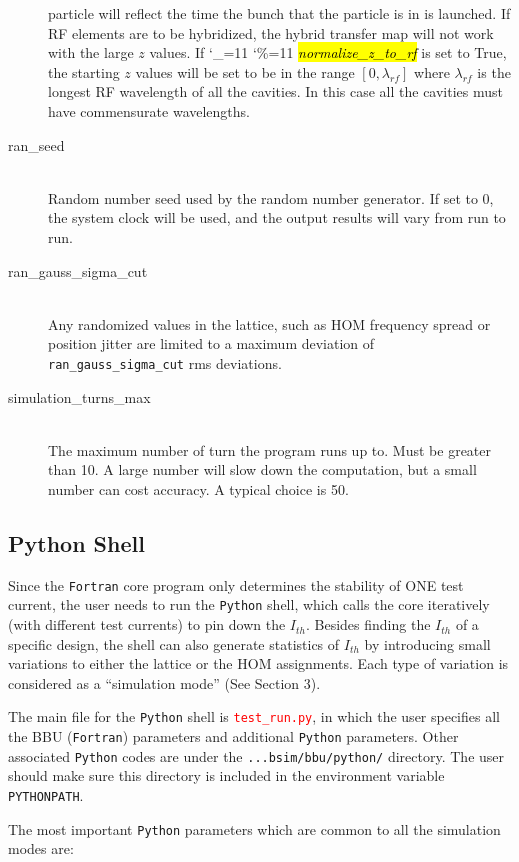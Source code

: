 \documentclass{hitec}
\newcommand\dottcmd[1]{\hl{\em#1}\endgroup}
\newcommand{\vn}{\begingroup\catcode`\_=11 \catcode`\%=11 \dottcmd}
\newcommand{\Newline}{\hfil \\}
\begin{document}
\begin{description}
particle will reflect the time the bunch that the particle is in is launched. If RF elements are to
be hybridized, the hybrid transfer map will not work with the large $z$ values. If \vn{normalize_z_to_rf} 
is set to True, the starting $z$ values will be set to be in the range $[0, \lambda_{rf}]$ where $\lambda_{rf}$ is the
longest RF wavelength of all the cavities. In this case all the cavities must have commensurate wavelengths.
%
\item[ran_seed] \Newline
Random number seed used by the random number generator. If set to 0, the system clock will be used, and the output results will vary from run to run.
%
\item[ran_gauss_sigma_cut] \Newline
Any randomized values in the lattice, such as HOM frequency spread or position jitter are
limited to a maximum deviation of \texttt{ran_gauss_sigma_cut} rms deviations.
%
\item[simulation_turns_max] \Newline
The maximum number of turn the program runs up to. Must be greater than 10. A large number will slow down the computation, but a small number can cost accuracy. A typical choice is 50.
%
\end{description}

\subsection{Python Shell}
Since the \texttt{Fortran} core program only determines the stability of ONE test current, the user needs to run the \texttt{Python} shell, which calls the core iteratively (with different test currents) to pin down the $I_{th}$. 
Besides finding the $I_{th}$ of a specific design, the shell can also generate statistics of $I_{th}$ by introducing small variations to either the lattice or the HOM assignments. Each type of variation is considered as a ``simulation mode'' (See Section 3). 

The main file for the \texttt{Python} shell is \textcolor{red}{\texttt{test_run.py}}, in which the user specifies all the BBU (\texttt{Fortran}) parameters and additional \texttt{Python} parameters. Other associated \texttt{Python} codes are under the \texttt{...bsim/bbu/python/} directory. The user should make sure this directory is included in the environment variable \texttt{PYTHONPATH}.

The most important \texttt{Python} parameters which are common to all the simulation modes are:
\end{document}
